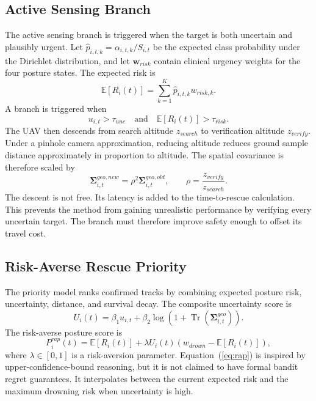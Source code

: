 \documentclass[runningheads]{llncs}
\newcommand{\operatorname}[1]{\mathop{\mathrm{#1}}}
\begin{document}
\subsection{Active Sensing Branch}

The active sensing branch is triggered when the target is both uncertain and plausibly urgent. Let $\hat{p}_{i,t,k}=\alpha_{i,t,k}/S_{i,t}$ be the expected class probability under the Dirichlet distribution, and let $\mathbf{w}_{risk}$ contain clinical urgency weights for the four posture states. The expected risk is
\begin{equation}
  \mathbb{E}[R_i(t)] = \sum_{k=1}^{K}\hat{p}_{i,t,k}w_{risk,k}.
\end{equation}
A branch is triggered when
\begin{equation}
  u_{i,t}>\tau_{unc} \quad \mathrm{and} \quad \mathbb{E}[R_i(t)]>\tau_{risk}.
  \label{eq:branch_condition}
\end{equation}
The UAV then descends from search altitude $z_{search}$ to verification altitude $z_{verify}$. Under a pinhole camera approximation, reducing altitude reduces ground sample distance approximately in proportion to altitude. The spatial covariance is therefore scaled by
\begin{equation}
  \boldsymbol{\Sigma}^{geo,new}_{i,t}=\rho^2\boldsymbol{\Sigma}^{geo,old}_{i,t}, \qquad
  \rho=\frac{z_{verify}}{z_{search}}.
\end{equation}
The descent is not free. Its latency is added to the time-to-rescue calculation. This prevents the method from gaining unrealistic performance by verifying every uncertain target. The branch must therefore improve safety enough to offset its travel cost.

\subsection{Risk-Averse Rescue Priority}

The priority model ranks confirmed tracks by combining expected posture risk, uncertainty, distance, and survival decay. The composite uncertainty score is
\begin{equation}
  U_i(t)=\beta_1u_{i,t}+\beta_2\log\!\left(1+\operatorname{Tr}(\boldsymbol{\Sigma}^{geo}_{i,t})\right).
\end{equation}
The risk-averse posture score is
\begin{equation}
  P^{rap}_i(t)=\mathbb{E}[R_i(t)]
  +\lambda U_i(t)\left(w_{drown}-\mathbb{E}[R_i(t)]\right),
  \label{eq:rap}
\end{equation}
where $\lambda \in [0,1]$ is a risk-aversion parameter. Equation~(\ref{eq:rap}) is inspired by upper-confidence-bound reasoning, but it is not claimed to have formal bandit regret guarantees. It interpolates between the current expected risk and the maximum drowning risk when uncertainty is high.
\end{document}
